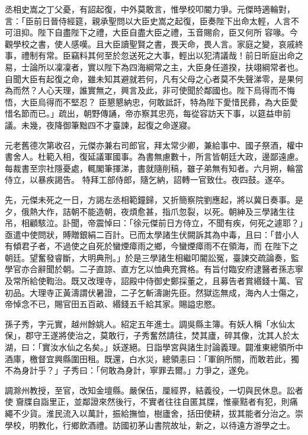\begin{pinyinscope}
 丞相史嵩之丁父憂，有詔起復，中外莫敢言，惟學校叩閽力爭。元傑時適輪對，言：「臣前日晉侍經筵，親承聖問以大臣史嵩之起復，臣奏陛下出命太輕，人言不可沮抑。陛下自盡陛下之禮，大臣自盡大臣之禮，玉音賜俞，臣又何所
 容喙。今觀學校之書，使人感嘆。且大臣讀聖賢之書，畏天命，畏人言。家庭之變，哀戚終事，禮制有常。臣竊料其何至於忽送死之大事，輕出以犯清議哉！前日昕庭出命之易，士論所以凜凜者，實以陛下為四海綱常之主，大臣身任道揆，扶翊綱常者也。自聞大臣有起復之命，雖未知其避就若何，凡有父母之心者莫不失聲涕零，是果何為而然？人心天理，誰實無之，興言及此，非可使聞於鄰國也。陛下烏得而不悔悟，大臣烏得而不堅忍？
 臣懇懇納忠，何敢詆訐，特為陛下愛惜民彞，為大臣愛惜名節而已。」疏出，朝野傳誦，帝亦察其忠亮，每從容訪天下事，以筵益申前議。未幾，夜降御筆黜四不才臺諫，起復之命遂寢。



 元老舊德次第收召，元傑亦兼右司郎官，拜太常少卿，兼給事中、國子祭酒，權中書舍人。杜範入相，復延議軍國事。為書無慮數十，所言皆朝廷大政，邊鄙遠慮。每裁書至宗社隱憂處，輒閣筆揮涕，書就隨削稿，雖子弟無有知者。六月朔，輪當侍立，以暴疾謁告。
 特拜工部侍郎，隨乞納，詔轉一官致仕。夜四鼓。遂卒。



 先，元傑未死之一日，方謁左丞相範鐘歸，又折簡察院劉應起，將以冀日奏事。是夕，俄熱大作，詰朝不能造朝，夜煩愈甚，指爪忽裂，以死。朝紳及三學諸生往吊，相顧駭泣。訃聞，帝震悼曰：「徐元傑前日方侍立，不聞有疾，何死之遽耶？」亟遣中使問狀，賻贈銀絹二百計。已而太學諸生伏闕訴其為中毒，且曰：「昔小人有傾君子者，不過使之自死於蠻煙瘴雨之鄉，今蠻煙瘴雨不在領海，而
 在陛下之朝廷。望奮發睿斷，大明典刑。」於是三學諸生相繼叩閽訟冤，臺諫交疏論奏，監學官亦合辭聞於朝。二子直諒、直方乞以恤典充賞格。有旨付臨安府逮醫者孫志寧及常所給使鞫治。既又改理寺，詔殿中侍御史鄭採董之，且募告者賞緡錢十萬、官初品。大理寺正黃濤謂伏暑證，二子乞斬濤謝先臣。然獄迄無成，海內人士傷之，帝悼念不已，賜官田五百畝、緡錢五千給其家。賜謚忠愍。



 孫子秀，字元實，越州餘姚人。紹定五年進士。調吳縣主簿。有妖人稱「水仙太保」，郡守王遂將使治之，莫敢行，子秀奮然請往，焚其廬，碎其像，沈其人於太湖，曰：「實汝水仙之名矣。」妖遂絕。日詣學宮與諸生討論義理。闢淮東總領所中酒庫，檄督宜興縣圍田租。既還，白水災，總領恚曰：「軍餉所關，而敢若此，獨不為身計乎？」子秀曰：「何敢為身計，寧罪去爾。」力爭之，遂免。



 調滁州教授，至官，改知金壇縣。嚴保伍，厘經界，結義役，一切與民休息。訟者使
 齎牒自詣里正，並鄰證來然後行，不實者往往自匿其牒，惟豪黠者有犯，則痛繩不少貨。淮民流入以萬計，振給撫恤，樹廬舍，括田使耕，拔其能者分治之。崇學校，明教化，行鄉飲酒禮。訪國初茅山書院故址，新之，以待遠方游學之士。




\end{pinyinscope}
